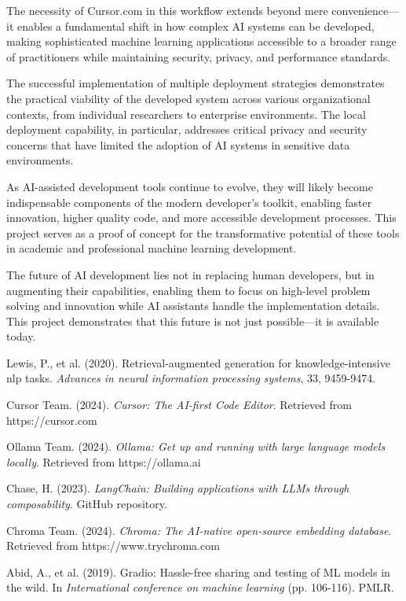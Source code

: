 \documentclass[12pt,letterpaper]{article}
\begin{document}
The necessity of Cursor.com in this workflow extends beyond mere convenience—it enables a fundamental shift in how complex AI systems can be developed, making sophisticated machine learning applications accessible to a broader range of practitioners while maintaining security, privacy, and performance standards.

The successful implementation of multiple deployment strategies demonstrates the practical viability of the developed system across various organizational contexts, from individual researchers to enterprise environments. The local deployment capability, in particular, addresses critical privacy and security concerns that have limited the adoption of AI systems in sensitive data environments.

As AI-assisted development tools continue to evolve, they will likely become indispensable components of the modern developer's toolkit, enabling faster innovation, higher quality code, and more accessible development processes. This project serves as a proof of concept for the transformative potential of these tools in academic and professional machine learning development.

The future of AI development lies not in replacing human developers, but in augmenting their capabilities, enabling them to focus on high-level problem solving and innovation while AI assistants handle the implementation details. This project demonstrates that this future is not just possible—it is available today.

\newpage

\begin{thebibliography}{99}

Lewis, P., et al. (2020). Retrieval-augmented generation for knowledge-intensive nlp tasks. \textit{Advances in neural information processing systems}, 33, 9459-9474.

Cursor Team. (2024). \textit{Cursor: The AI-first Code Editor}. Retrieved from https://cursor.com

Ollama Team. (2024). \textit{Ollama: Get up and running with large language models locally}. Retrieved from https://ollama.ai

Chase, H. (2023). \textit{LangChain: Building applications with LLMs through composability}. GitHub repository.

Chroma Team. (2024). \textit{Chroma: The AI-native open-source embedding database}. Retrieved from https://www.trychroma.com

Abid, A., et al. (2019). Gradio: Hassle-free sharing and testing of ML models in the wild. In \textit{International conference on machine learning} (pp. 106-116). PMLR.

\end{thebibliography}
\end{document}
